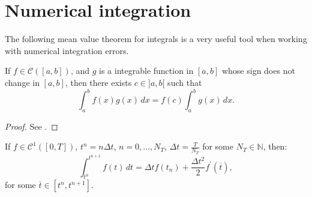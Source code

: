 \section{Numerical integration}
\label{anexo-numint}
The following mean value theorem for integrals is a very useful tool 
when working with numerical integration errors.
\begin{thrm}
	\label{anexo-numint-mv}
	If $f \in \mathcal{C}([a,b])$, and $g$ is a integrable function in $[a,b]$
	whose sign does not change in $[a,b]$,
	then there exists $c \in ]a,b[$ such that
	\begin{equation*}
		\int_{a}^{b}f(x)g(x) \,dx = f(c)\int_{a}^{b}g(x) \,dx.
	\end{equation*}
\end{thrm}
\begin{proof}
	See \citet[\pno~143]{courant:1999}.
\end{proof}

\begin{corollary}
	\label{anexo-numint-col1}
	If $f\in \mathcal{C}^1([0,T])$, $t^n = n\Delta t$, $n=0, \ldots, N_T$, $\Delta t = \frac{T}{N_T}$ for some 
	$N_T \in \mathbb{N}$, then:
	\begin{equation}
		\int_{t^n}^{t^{n+1}} f(t)\,dt = \Delta t  f(t_{n})
		+ \frac{\Delta t^{2}}{2} f^{'}(\overline{t}),
	\end{equation}
for some $\overline{t} \in [t^n, t^{n+1}]$.
\end{corollary}

